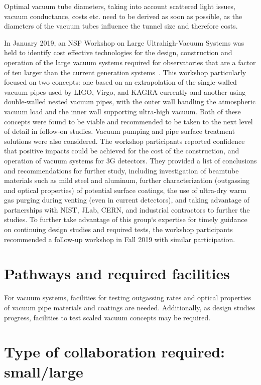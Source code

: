 Optimal vacuum tube diameters, taking into account scattered light issues, vacuum conductance, costs etc. need to be derived as soon as possible, as the diameters of the vacuum tubes influence the tunnel size and therefore costs.

In January 2019, an NSF Workshop on Large Ultrahigh-Vacuum Systems was held to identify cost effective technologies for the design, construction and operation of the large vacuum systems required for observatories that are a factor of ten larger than the current generation systems~\cite{LLOVacWorkshop2019}. This workshop particularly focused on two concepts: one based on an extrapolation of the single-walled vacuum pipes used by LIGO, Virgo, and KAGRA currently and another using double-walled nested vacuum pipes, with the outer wall handling the atmospheric vacuum load and the inner wall supporting ultra-high vacuum. Both of these concepts were found to be viable and recommended to be taken to the next level of detail in follow-on studies. Vacuum pumping and pipe surface treatment solutions were also considered. The workshop participants reported confidence that positive impacts could be achieved for the cost of the construction, and operation of vacuum systems for 3G detectors. They provided a list of conclusions and recommendations for further study, including investigation of beamtube materials such as mild steel and aluminum, further characterization (outgassing and optical properties) of potential surface coatings, the use of ultra-dry warm gas purging during venting (even in current detectors), and taking advantage of partnerships with NIST, JLab, CERN, and industrial contractors to further the studies. To further take advantage of this group‘s expertise for timely guidance on continuing design studies and required tests, the workshop participants recommended a follow-up workshop in Fall 2019 with similar participation.

\section{Pathways and required facilities}

For vacuum systems, facilities for testing outgassing rates and optical properties of vacuum pipe materials and coatings are needed. Additionally, as design studies progress, facilities to test scaled vacuum concepts may be required. 

\section{Type of collaboration required:  small/large}

